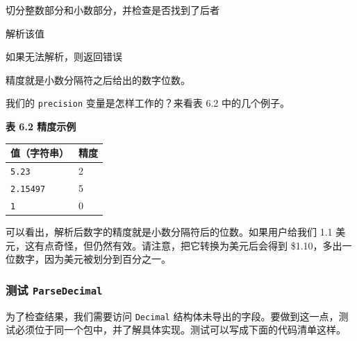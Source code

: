 \begin{codeannotations}
\item 切分整数部分和小数部分，并检查是否找到了后者
\item 解析该值
\item 如果无法解析，则返回错误
\item 精度就是小数分隔符之后给出的数字位数。
\end{codeannotations}

我们的 \texttt{precision} 变量是怎样工作的？来看表 6.2 中的几个例子。

\medskip
\noindent\textbf{表 6.2 精度示例}

\begin{center}
\begin{tabular}{|l|l|}
\hline
值（字符串） & 精度 \\
\hline
\texttt{5.23} & 2 \\
\hline
\texttt{2.15497} & 5 \\
\hline
\texttt{1} & 0 \\
\hline
\end{tabular}
\end{center}

可以看出，解析后数字的精度就是小数分隔符后的位数。如果用户给我们 1.1 美元，这有点奇怪，但仍然有效。请注意，把它转换为美元后会得到 \$1.10，多出一位数字，因为美元被划分到百分之一。

\subsubsection*{测试 \texttt{ParseDecimal}}

为了检查结果，我们需要访问 \texttt{Decimal} 结构体未导出的字段。要做到这一点，测试必须位于同一个包中，并了解具体实现。测试可以写成下面的代码清单这样。

